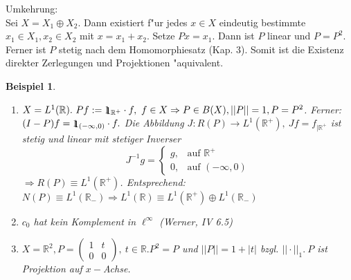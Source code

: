 \documentclass[a4paper,11pt]{book}
\newcommand{\R}{{\mathbb R}}
\newcommand{\ind}{1\hspace{-0,9ex}\raisebox{-0,2ex}{1}}
\newtheorem{Bsp}[Def]{Beispiel}
\theoremstyle{nonumberplain}
\begin{document}
Umkehrung:\\
Sei $X = X_1 \oplus X_2$. Dann existiert f"ur jedes $x \in X$ eindeutig bestimmte $x_1 \in X_1, x_2 \in X_2$ mit $x = x_1 + x_2$. Setze $Px = x_1$. Dann ist $P$ linear und $P=P^2$. Ferner ist $P$ stetig nach dem Homomorphiesatz (Kap. 3). Somit ist die Existenz direkter Zerlegungen und Projektionen "aquivalent.

\begin{Bsp}
\begin{enumerate}

\item[a)] $X = L^1(\R).\ Pf := \ind_{\R^+} \cdot f,\ f \in X \Rightarrow P \in B(X), ||P|| = 1, P = P^2$. Ferner: $(I-P)f = \ind_{(-\infty,0)} \cdot f.$ Die Abbildung $J: R(P) \rightarrow L^1(\R^+),\ Jf = f_{|\R^+}$ ist stetig und linear mit stetiger Inverser
\[
J^{-1}g = \left\{
\begin{array}{cl}
g ,& \text{auf } \R^+ \\
0 ,& \text{auf } (-\infty,0)
\end{array} \right.
\]
$\Rightarrow R(P) \equiv L^1(\R^+)$. Entsprechend: $N(P) \equiv L^1(\R_-) \Rightarrow L^1(\R) \equiv L^1(\R^+) \oplus L^1(\R_-)$

\item[b)] $c_0$ hat kein Komplement in $\ell^{\infty}$ (Werner, IV 6.5)

\item[c)] $X = \R^2, P = \begin{pmatrix} 1 & t \\ 0 & 0 \end{pmatrix},\ t \in \R. P^2 = P$ und $||P|| = 1 + |t|$ bzgl. $||\cdot||_1.\ P$ ist Projektion auf $x-$Achse.
\end{enumerate}
\end{Bsp}
\end{document}
